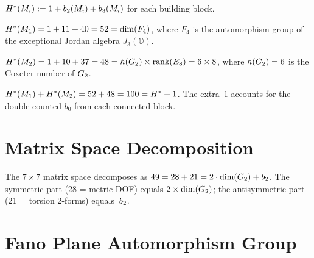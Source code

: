 \begin{definition}[$\Hstar(M_i)$]\label{def:H_star_blocks}
    \leanok
    $H^*(M_i) := 1 + b_2(M_i) + b_3(M_i)$ for each building block.
\end{definition}

\begin{theorem}[$\Hstar(M_1) = \opdim(F_4)$]\label{thm:H_star_M1_F4}
    \leanok
    $H^*(M_1) = 1 + 11 + 40 = 52 = \mathrm{dim}(F_4)$, where $F_4$ is
    the automorphism group of the exceptional Jordan algebra $J_3(\mathbb{O})$.
\end{theorem}

\begin{theorem}[$\Hstar(M_2) = h(\Gtwo) \times \mathrm{rank}(E_8)$]\label{thm:H_star_M2_coxeter}
    \leanok
    $H^*(M_2) = 1 + 10 + 37 = 48 = h(G_2) \times \mathrm{rank}(E_8) = 6 \times 8$,
    where $h(G_2) = 6$ is the Coxeter number of $G_2$.
\end{theorem}

\begin{theorem}\label{thm:H_star_blocks_sum}
    \leanok
    $H^*(M_1) + H^*(M_2) = 52 + 48 = 100 = H^* + 1$.
    The extra~$1$ accounts for the double-counted $b_0$ from each connected block.
\end{theorem}

\section{Matrix Space Decomposition}

\begin{theorem}[$\opdim(K_7)^2 = 2 \cdot \opdim(\Gtwo) + \btwo$]\label{thm:matrix_decomp}
    \leanok
    The $7 \times 7$ matrix space decomposes as
    $49 = 28 + 21 = 2 \cdot \mathrm{dim}(G_2) + b_2$.
    The symmetric part (28 = metric DOF) equals $2 \times \mathrm{dim}(G_2)$;
    the antisymmetric part (21 = torsion 2-forms) equals~$b_2$.
\end{theorem}

\section{Fano Plane Automorphism Group}

